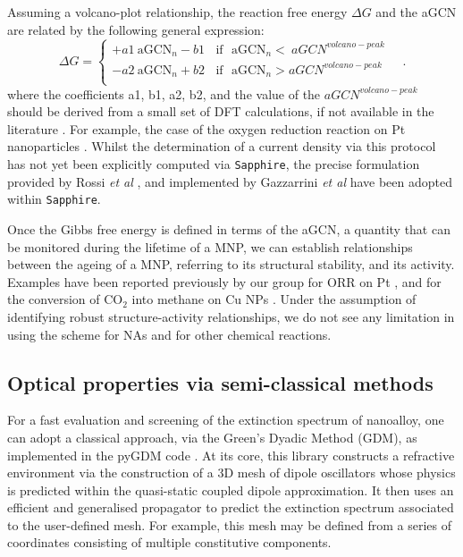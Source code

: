 %
Assuming a volcano-plot relationship, 
the reaction free energy $\Delta G$ and the aGCN are related by the following general expression:
\begin{equation}
\Delta G =
    \begin{cases}
     + a1 ~ \textrm{aGCN}_n - b1 ~~~~\textrm{if~ aGCN}_n<~ aGCN^{volcano-peak} \\
     - a2 ~ \textrm{aGCN}_n + b2 ~~~~\textrm{if~ aGCN}_n> aGCN^{volcano-peak} \\
    \end{cases}
    \mbox{~~~.}
\label{eq:volcano}
\end{equation}
%
where the coefficients a1, b1, a2, b2, and the value of the $aGCN^{volcano-peak}$ should be derived from a small set of DFT calculations, if not available in the literature \cite{FCVChemSci2018}. For example, the case of the oxygen reduction reaction on Pt nanoparticles \cite{Rossi2020}. Whilst the determination of a current density via this protocol has not yet been explicitly computed via \texttt{Sapphire}, the precise formulation provided by Rossi \textit{et al} \cite{Rossi2020}, and implemented by Gazzarrini \textit{et al} \cite{Gazzarrini2021} have been adopted within \texttt{Sapphire}.

Once the Gibbs free energy is defined in terms of the aGCN, a quantity that can be monitored during the lifetime of a MNP, we can establish relationships between the ageing of a MNP, referring to its structural stability, and its activity. Examples have been reported previously by our group for ORR on Pt \cite{Rossi2020}, and for the conversion of CO$_{2}$ into methane on Cu NPs \cite{Gazzarrini2021}. Under the assumption of identifying robust structure-activity relationships, we do not see any limitation in using the scheme for NAs and for other chemical reactions.

\subsection{Optical properties via semi-classical methods}

For a fast evaluation and screening of the extinction spectrum of nanoalloy, one can adopt a classical approach, via the Green's Dyadic Method (GDM), \cite{GDM,Girard_2005} as implemented in the pyGDM code \cite{pyGDM,pyGDMarXiv}.
%
At its core, this library constructs a refractive environment via the construction of a 3D mesh of dipole oscillators whose physics is predicted within the quasi-static coupled dipole approximation.
%
It then uses an efficient and generalised propagator to predict the extinction spectrum associated to the user-defined mesh. For example, this mesh may be defined from a series of coordinates consisting of multiple constitutive components. 
%


